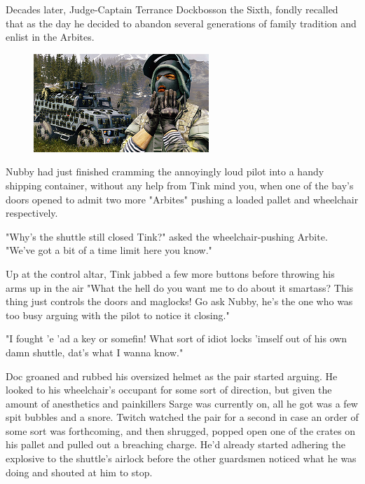 Decades later, Judge-Captain Terrance Dockbosson the Sixth, fondly recalled that as the day he decided to abandon several generations of family tradition and enlist in the Arbites.

\begin{figure}
	\begin{center}
		\includegraphics[width=\figwidth]{pics/20/9.png}
	\end{center}
\end{figure}

Nubby had just finished cramming the annoyingly loud pilot into a handy shipping container, without any help from Tink mind you, when one of the bay's doors opened to admit two more "Arbites" pushing a loaded pallet and wheelchair respectively.

"Why's the shuttle still closed Tink?" asked the wheelchair-pushing Arbite. 
"We've got a bit of a time limit here you know."

Up at the control altar, Tink jabbed a few more buttons before throwing his arms up in the air "What the hell do you want me to do about it smartass? 
This thing just controls the doors and maglocks! 
Go ask Nubby, he's the one who was too busy arguing with the pilot to notice it closing."

"I fought 'e 'ad a key or somefin! 
What sort of idiot locks 'imself out of his own damn shuttle, dat's what I wanna know."

Doc groaned and rubbed his oversized helmet as the pair started arguing. 
He looked to his wheelchair's occupant for some sort of direction, but given the amount of anesthetics and painkillers Sarge was currently on, all he got was a few spit bubbles and a snore. 
Twitch watched the pair for a second in case an order of some sort was forthcoming, and then shrugged, popped open one of the crates on his pallet and pulled out a breaching charge. 
He'd already started adhering the explosive to the shuttle's airlock before the other guardsmen noticed what he was doing and shouted at him to stop. 


